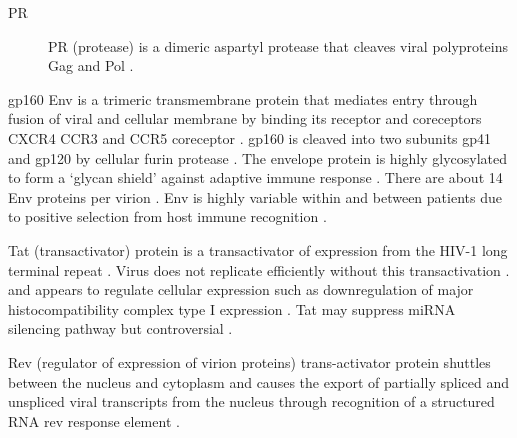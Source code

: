 \documentclass[../sherrill-Mix_thesis.tex]{subfiles}
\begin{document}
\begin{description}
\begin{description}
				\item[PR]
					PR (protease) is a dimeric aspartyl protease \citep{Wlodawer1989} that cleaves viral polyproteins Gag and Pol \citep{Kraeusslich1989,Kohl1988}. 
			\end{description}
		\item[\env{}]
			gp160 Env is a trimeric transmembrane protein that mediates entry through fusion of viral and cellular membrane by binding its receptor \cdFour{} \citep{Dalgleish1984,Klatzmann1984,Lifson1986,Lifson1986a,Maddon1986} and coreceptors CXCR4 \citep{Feng1996} CCR3 and CCR5 coreceptor \citep{Choe1996,He1997}. gp160 is cleaved into two subunits gp41 and gp120 \citep{Veronese1985} by cellular furin protease \citep{Hallenberger1992}. The envelope protein is highly glycosylated to form a `glycan shield' against adaptive immune response \citep{Wei2003}. There are about 14 Env proteins per virion \citep{Zhu2006}. Env is highly variable within and between patients \citep{Holmes1992,Shankarappa1999} due to positive selection from host immune recognition \citep{Bonhoeffer1995,Wolinsky1996,Ross2002}. %
		\item[\tat{}]
			Tat (transactivator) protein is a transactivator of expression from the HIV-1 long terminal repeat \citep{Sodroski1985,Sodroski1985a,Cullen1986}. Virus does not replicate efficiently without this transactivation \citep{Dayton1986}. and appears to regulate cellular expression such as downregulation of major histocompatibility complex type I expression \citep{Howcroft1993}.  Tat may suppress miRNA silencing pathway \citep{Bennasser2005,Triboulet2007,Qian2009} but controversial \citep{Lin2007}.
		\item[\rev{}]
			Rev (regulator of expression of virion proteins) trans-activator protein shuttles between the nucleus and cytoplasm \citep{Meyer1994} and causes the export of partially spliced and unspliced viral transcripts \citep{Sodroski1986,Feinberg1986,Knight1987,Malim1988,Gutman1988} from the nucleus through recognition of a structured RNA rev response element \citep{Malim1989,Malim1989a}.
		\item[\nef{}]

\end{description}
\end{document}
